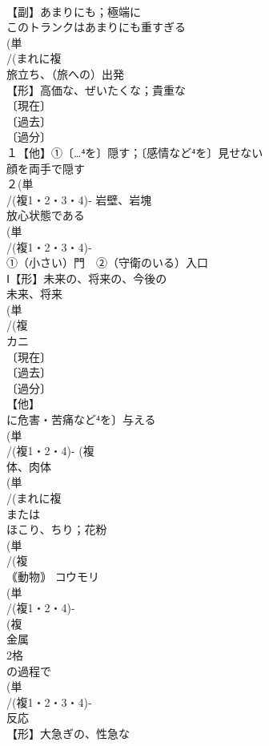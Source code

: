 \documentclass[8pt]{extreport}
\begin{document}
\begin{CJK}{UTF8}{min}
\\	【副】あまりにも；極端に 
\\	このトランクはあまりにも重すぎる
\\	(単
\\	/(まれに複
\\	旅立ち、（旅への）出発 
\\	【形】高価な、ぜいたくな；貴重な 
\\	〔現在〕
\\	〔過去〕
\\	〔過分〕
\\	１【他】①〔…⁴を〕隠す；〔感情など⁴を〕見せない 
\\	顔を両手で隠す 
\\	２(単
\\	/(複1・2・3・4)‐ 岩壁、岩塊
\\	放心状態である
\\	(単
\\	/(複1・2・3・4)‐
\\	①（小さい）門　②（守衛のいる）入口
\\	Ⅰ【形】未来の、将来の、今後の 
\\	未来、将来
\\	(単
\\	/(複
\\	カニ 
\\	〔現在〕
\\	〔過去〕
\\	〔過分〕
\\	【他】
\\	に危害・苦痛など⁴を〕与える
\\	(単
\\	/(複1・2・4)- (複
\\	体、肉体 
\\	(単
\\	/(まれに複
\\	または
\\	ほこり、ちり；花粉 
\\	(単
\\	/(複
\\	｟動物｠ コウモリ 
\\	(単
\\	/(複1・2・4)-
\\	(複
\\	金属 
\\	2格	
\\	の過程で
\\	(単
\\	/(複1・2・3・4)‐
\\	反応 
\\	【形】大急ぎの、性急な 

\end{CJK}
\end{document}
